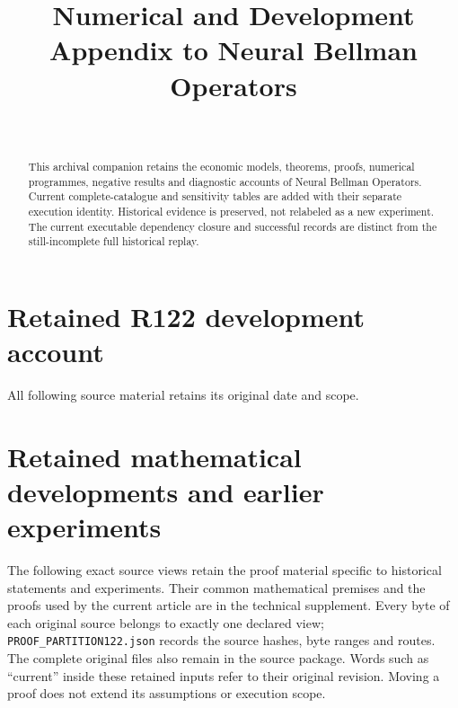 \documentclass[ecta,nameyear,draft]{econsocart}
\begin{document}
\begin{frontmatter}
\title{Numerical and Development Appendix to Neural Bellman Operators}
\begin{aug}
\author[id=au1,addressref={add1}]{~}
\address[id=add1]{Peking University}
\end{aug}
\begin{abstract}This archival companion retains the economic models, theorems, proofs, numerical programmes, negative results and diagnostic accounts of Neural Bellman Operators. Current complete-catalogue and sensitivity tables are added with their separate execution identity. Historical evidence is preserved, not relabeled as a new experiment. The current executable dependency closure and successful records are distinct from the still-incomplete full historical replay.\end{abstract}
\end{frontmatter}
\appendix
\renewcommand{\thetheorem}{A.\arabic{theorem}}
\renewcommand{\theequation}{A.\arabic{equation}}
\renewcommand{\thesection}{\AlphAlph{\value{section}}}


\section{Retained R122 development account}
All following source material retains its original date and scope.

\section{Retained mathematical developments and earlier experiments}
\label{dev:proofpartition122}
The following exact source views retain the proof material specific to
historical statements and experiments. Their common mathematical premises
and the proofs used by the current article are in the technical supplement.
Every byte of each original source belongs to exactly one declared view;
\texttt{PROOF\_PARTITION122.json} records the source hashes, byte ranges
and routes. The complete original files also remain in the source package.
Words such as ``current'' inside these retained inputs refer to their original
revision. Moving a proof does not extend its assumptions or execution scope.















\end{document}
